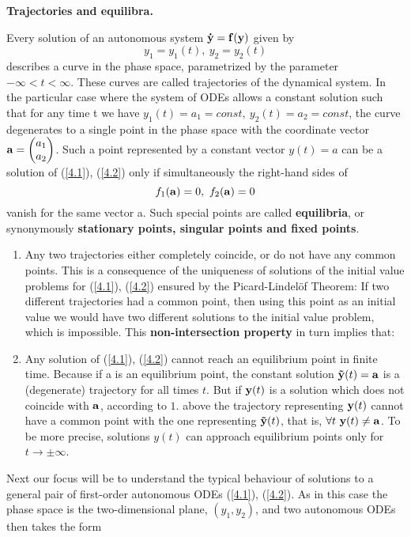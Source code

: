 \documentclass[11pt,a4paper,twoside]{article}
\begin{document}
	\textbf{Trajectories and equilibra.}\par
	Every solution of an autonomous system $\vb{\dot{y}} = \vb{f}(\vb{y})$ given by
	\begin{equation}\label{4.3}
		y_1 = y_1(t),\ y_2 = y_2(t)
	\end{equation}
	describes a curve in the phase space, parametrized by the parameter $-\infty < t < \infty$. These curves are called trajectories of the dynamical system. In the particular case where the system of ODEs allows a constant solution such that for any time t we have $y_1(t) = a_1 = const,\ y_2(t) = a_2 = const$, the curve degenerates to a single point in the phase space with the coordinate vector
	$
	\vb{a}
	=
	\begin{pmatrix}
		a_1\\
		a_2
	\end{pmatrix}
	$.
	Such a point represented by a constant vector $y(t) = a$ can be a solution of (\ref{4.1}), (\ref{4.2}) only if simultaneously the right-hand sides of
	$$
	f_1(\vb{a}) = 0,\ f_2(\vb{a}) = 0
	$$
	vanish for the same vector a. Such special points are called \textbf{equilibria}, or synonymously \textbf{stationary points, singular points and fixed points}.
	\begin{enumerate}
		\item Any two trajectories either completely coincide, or do not have any common points. This is a consequence of the uniqueness of solutions of the initial value problems for (\ref{4.1}), (\ref{4.2}) ensured by the Picard-Lindel\"{o}f Theorem: If two different trajectories had a common point, then using this point as an initial value we would have two different solutions to the initial value problem, which is impossible. This \textbf{non-intersection property} in turn implies that:
		\item Any solution of (\ref{4.1}), (\ref{4.2}) cannot reach an equilibrium point in finite time. Because if a is an equilibrium point, the constant solution $\vb{\tilde{y}}(t) = \vb{a}$ is a (degenerate) trajectory for all times $t$. But if $\vb{y}(t)$ is a solution which does not coincide with $\vb{a}$, according to $1$. above the trajectory representing $\vb{y}(t)$ cannot have a common point with the one representing $\vb{\tilde{y}}(t)$, that is, $\forall t\ \vb{y}(t) \neq \vb{a}$. To be more precise,  solutions $y(t)$ can approach equilibrium points only for $t \to \pm \infty$.
	\end{enumerate}
	Next our focus will be to understand the typical behaviour of solutions to a general pair of first-order autonomous ODEs (\ref{4.1}), (\ref{4.2}). As in this case the phase space is the two-dimensional plane, $(y_1, y_2)$, and two autonomous ODEs then takes the form
\end{document}
